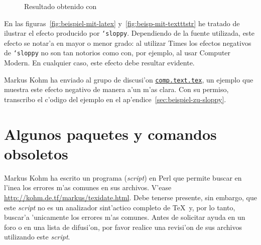 \documentclass[11pt,a4paper,pagesize,tablecaptionabove,abstracton,pointlessnumbers]{scrartcl}
\newcommand{\News}[1]{\href{news:#1}{\texttt{#1}}}
\newcommand{\News}[1]{\href{news:#1}{\texttt{#1}}}
\DeclareRobustCommand*{\Macro}[1]{\mbox{\texttt{\char`\\#1}}}
\begin{document}
\begin{figure}[htp]
  \begin{minipage}[t]{.45\textwidth}
    \caption{Configuraci'on est'andar de \LaTeX}%
    \label{fig:beispiel-mit-latex}%
  \end{minipage}%
  \hfill%
  \begin{minipage}[t]{.45\textwidth}
    \centering    
    {\fontsize{10pt}{12pt}\selectfont
      }
    \caption{Resultado obtenido con \texttt{\string\sloppy}}
    \label{fig:beisp-mit-textttstr}
  \end{minipage}
\end{figure}

En las figuras~\ref{fig:beispiel-mit-latex}
y~\vref{fig:beisp-mit-textttstr} he tratado de ilustrar el efecto producido por 
\Macro{sloppy}. Dependiendo de la fuente utilizada, este efecto se notar'a en mayor o menor grado: al utilizar Times los efectos negativos de \Macro{sloppy} no son tan notorios como con, por ejemplo, al usar Computer Modern. En cualquier caso, este efecto debe resultar evidente.

Markus Kohm ha enviado al grupo de discusi'on \News{comp.text.tex}, un ejemplo que muestra este efecto negativo de manera  a'un m'as clara. Con su permiso, transcribo el c'odigo del ejemplo en el ap'endice~\vref{sec:beispiel-zu-sloppy}.

\section{Algunos paquetes y comandos obsoletos}
\label{sec:obsoletes}

Markus Kohm ha escrito un programa (\textit{script}) en Perl que permite buscar en l'inea los errores m'as comunes en sus archivos. V'ease \url{http://kohm.de.tf/markus/texidate.html}. Debe tenerse presente, sin embargo, que este \textit{script} no es un analizador sint'actico completo de \TeX\ y, por lo tanto, buscar'a 'unicamente los errores m'as comunes. Antes de solicitar ayuda en un foro o en una lista de difusi'on, por favor realice una revisi'on de sus archivos utilizando este \textit{script}.
\end{document}
